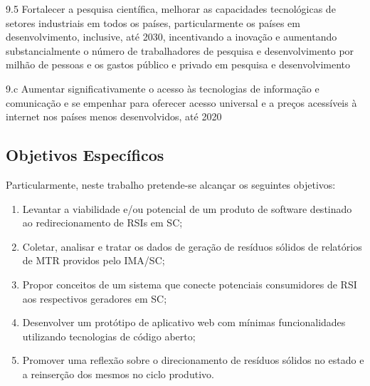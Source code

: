 \begin{citacao}
	9.5 Fortalecer a pesquisa científica, melhorar as capacidades tecnológicas de setores industriais em todos os países, particularmente os países em desenvolvimento, inclusive, até 2030, incentivando a inovação e aumentando substancialmente o número de trabalhadores de pesquisa e desenvolvimento por milhão de pessoas e os gastos público e privado em pesquisa e desenvolvimento
\end{citacao}

\begin{citacao}
	9.c Aumentar significativamente o acesso às tecnologias de informação e comunicação e se empenhar para oferecer acesso universal e a preços acessíveis à internet nos países menos desenvolvidos, até 2020
\end{citacao}

\subsection{Objetivos Específicos}

Particularmente, neste trabalho pretende-se alcançar os seguintes objetivos:
\begin{enumerate}
    \item Levantar a viabilidade e/ou potencial de um produto de software destinado ao redirecionamento de \gls{RSI}s em \gls{SC};
	\item Coletar, analisar e tratar os dados de geração de resíduos sólidos de relatórios de \gls{MTR} providos pelo \gls{IMA/SC};
	\item Propor conceitos de um sistema que conecte potenciais consumidores de \gls{RSI} aos respectivos geradores em \gls{SC};
	\item Desenvolver um protótipo de aplicativo web com mínimas funcionalidades utilizando tecnologias de código aberto;
	\item Promover uma reflexão sobre o direcionamento de resíduos sólidos no estado e a reinserção dos mesmos no ciclo produtivo.
\end{enumerate}